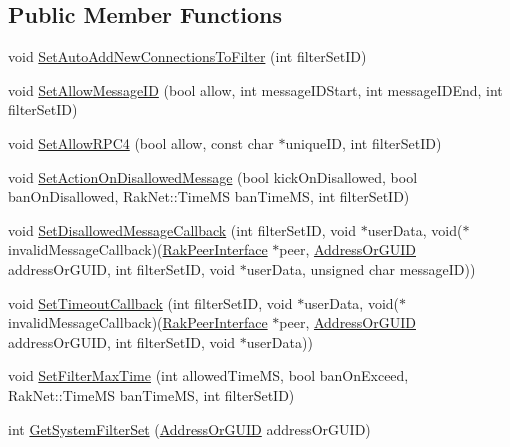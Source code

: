 \subsection*{Public Member Functions}
\begin{DoxyCompactItemize}
\item 
void \hyperlink{class_rak_net_1_1_message_filter_ad207896513cde1caabbe15dec09905ed}{Set\-Auto\-Add\-New\-Connections\-To\-Filter} (int filter\-Set\-I\-D)
\item 
void \hyperlink{class_rak_net_1_1_message_filter_a480178a464758a5c61dffb631a4d37e7}{Set\-Allow\-Message\-I\-D} (bool allow, int message\-I\-D\-Start, int message\-I\-D\-End, int filter\-Set\-I\-D)
\item 
void \hyperlink{class_rak_net_1_1_message_filter_a9358562591bdafa115abd66c05bfce9b}{Set\-Allow\-R\-P\-C4} (bool allow, const char $\ast$unique\-I\-D, int filter\-Set\-I\-D)
\item 
void \hyperlink{class_rak_net_1_1_message_filter_a30227e441526fedf5ae3cc0f5c98f070}{Set\-Action\-On\-Disallowed\-Message} (bool kick\-On\-Disallowed, bool ban\-On\-Disallowed, Rak\-Net\-::\-Time\-M\-S ban\-Time\-M\-S, int filter\-Set\-I\-D)
\item 
void \hyperlink{class_rak_net_1_1_message_filter_af7b8fecc161af465177dd3ba34c20d05}{Set\-Disallowed\-Message\-Callback} (int filter\-Set\-I\-D, void $\ast$user\-Data, void($\ast$invalid\-Message\-Callback)(\hyperlink{class_rak_net_1_1_rak_peer_interface}{Rak\-Peer\-Interface} $\ast$peer, \hyperlink{struct_rak_net_1_1_address_or_g_u_i_d}{Address\-Or\-G\-U\-I\-D} address\-Or\-G\-U\-I\-D, int filter\-Set\-I\-D, void $\ast$user\-Data, unsigned char message\-I\-D))
\item 
void \hyperlink{class_rak_net_1_1_message_filter_a4583f67ca1a4145926ad9f40f54852b8}{Set\-Timeout\-Callback} (int filter\-Set\-I\-D, void $\ast$user\-Data, void($\ast$invalid\-Message\-Callback)(\hyperlink{class_rak_net_1_1_rak_peer_interface}{Rak\-Peer\-Interface} $\ast$peer, \hyperlink{struct_rak_net_1_1_address_or_g_u_i_d}{Address\-Or\-G\-U\-I\-D} address\-Or\-G\-U\-I\-D, int filter\-Set\-I\-D, void $\ast$user\-Data))
\item 
void \hyperlink{class_rak_net_1_1_message_filter_a9f0d7e572f0942e8464a81455f05e81a}{Set\-Filter\-Max\-Time} (int allowed\-Time\-M\-S, bool ban\-On\-Exceed, Rak\-Net\-::\-Time\-M\-S ban\-Time\-M\-S, int filter\-Set\-I\-D)
\item 
int \hyperlink{class_rak_net_1_1_message_filter_abe03dc6ec1d3aee02c26317b5a49fc34}{Get\-System\-Filter\-Set} (\hyperlink{struct_rak_net_1_1_address_or_g_u_i_d}{Address\-Or\-G\-U\-I\-D} address\-Or\-G\-U\-I\-D)

\end{DoxyCompactItemize}
